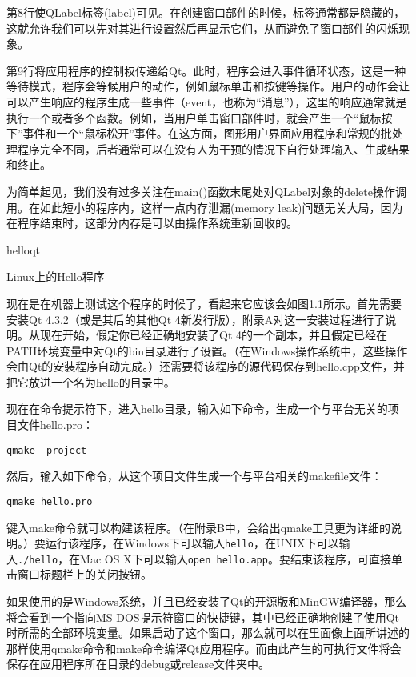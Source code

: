 \documentclass[11pt,oneside]{book}
\begin{document}
\begin{common-format}
第8行使QLabel标签(label)可见。在创建窗口部件的时候，标签通常都是隐藏的，这就允许我们可以先对其进行设置然后再显示它们，从而避免了窗口部件的闪烁现象。

第9行将应用程序的控制权传递给Qt。此时，程序会进入事件循环状态，这是一种等待模式，程序会等候用户的动作，例如鼠标单击和按键等操作。用户的动作会让可以产生响应的程序生成一些事件（event，也称为“消息”），这里的响应通常就是执行一个或者多个函数。例如，当用户单击窗口部件时，就会产生一个“鼠标按下”事件和一个“鼠标松开”事件。在这方面，图形用户界面应用程序和常规的批处理程序完全不同，后者通常可以在没有人为干预的情况下自行处理输入、生成结果和终止。

为简单起见，我们没有过多关注在main()函数末尾处对QLabel对象的delete操作调用。在如此短小的程序内，这样一点内存泄漏(memory  leak)问题无关大局，因为在程序结束时，这部分内存是可以由操作系统重新回收的。
\begin{fig}{helloqt}
\caption{Linux上的Hello程序}
\label{fig:Linux上的Hello程序}
\end{fig}

现在是在机器上测试这个程序的时候了，看起来它应该会如图1.1所示。首先需要安装Qt 4.3.2（或是其后的其他Qt 4新发行版），附录A对这一安装过程进行了说明。从现在开始，假定你已经正确地安装了Qt 4的一个副本，并且假定已经在PATH环境变量中对Qt的bin目录进行了设置。（在Windows操作系统中，这些操作会由Qt的安装程序自动完成。）还需要将该程序的源代码保存到hello.cpp文件，并把它放进一个名为hello的目录中。

现在在命令提示符下，进入hello目录，输入如下命令，生成一个与平台无关的项目文件hello.pro：
\begin{Verbatim}
qmake -project
\end{Verbatim}

然后，输入如下命令，从这个项目文件生成一个与平台相关的makefile文件：

\begin{Verbatim}
qmake hello.pro
\end{Verbatim}

键入make命令就可以构建该程序。（在附录B中，会给出qmake工具更为详细的说明。）要运行该程序，在Windows下可以输入\verb+hello+，在UNIX下可以输入\verb+./hello+，在Mac OS X下可以输入\verb+open hello.app+。要结束该程序，可直接单击窗口标题栏上的关闭按钮。

如果使用的是Windows系统，并且已经安装了Qt的开源版和MinGW编译器，那么将会看到一个指向MS-DOS提示符窗口的快捷键，其中已经正确地创建了使用Qt时所需的全部环境变量。如果启动了这个窗口，那么就可以在里面像上面所讲述的那样使用qmake命令和make命令编译Qt应用程序。而由此产生的可执行文件将会保存在应用程序所在目录的debug或release文件夹中。


\end{common-format}
\end{document}
